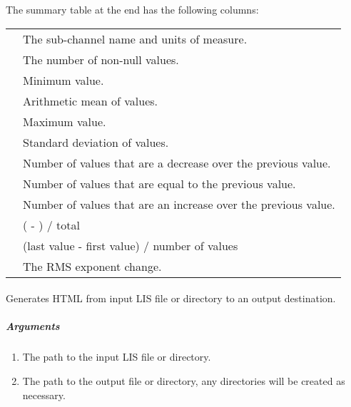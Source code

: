 \documentclass[letterpaper,10pt,english]{sphinxmanual}
\begin{document}
The summary table at the end has the following columns:


\begin{savenotes}\sphinxattablestart
\centering
\begin{tabulary}{\linewidth}[t]{|T|T|}
\hline
{}\relax &\relax \\
\hline
{}
&
The sub-channel name and units of measure.
\\
\hline
{}
&
The number of non-null values.
\\
\hline
{}
&
Minimum value.
\\
\hline
{}
&
Arithmetic mean of values.
\\
\hline
{}
&
Maximum value.
\\
\hline
{}
&
Standard deviation of values.
\\
\hline
\sphinxcode{-{-}}
&
Number of values that are a decrease over the previous value.
\\
\hline
\sphinxcode{==}
&
Number of values that are equal to the previous value.
\\
\hline
\sphinxcode{++}
&
Number of values that are an increase over the previous value.
\\
\hline
{}
&
(\sphinxcode{-{-}} - \sphinxcode{++}) / total
\\
\hline
{}
&
(last value - first value) / number of values
\\
\hline
{}
&
The RMS exponent change.
\\
\hline
\end{tabulary}
\par
\sphinxattableend\end{savenotes}


\paragraph{}
\label{\detokenize{cmd_line_tools/LIS_cmd_line_tools:tdlistohtml}}\label{\detokenize{cmd_line_tools/LIS_cmd_line_tools:totaldepth-liscmdline-listohtml}}
Generates HTML from input LIS file or directory to an output destination.


\subparagraph{Arguments}
\label{\detokenize{cmd_line_tools/LIS_cmd_line_tools:id10}}\begin{enumerate}
\item {} 
The path to the input LIS file or directory.

\item {} 
The path to the output file or directory, any directories will be created as necessary.

\end{enumerate}
\end{document}

